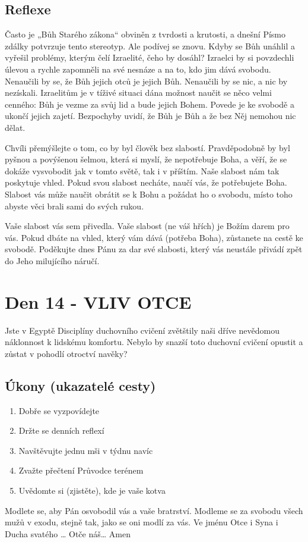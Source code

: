 \documentclass[11pt]{article}
\newcommand{\zacatekDruhyTyden}{
  Jste v Egyptě \newline
  Disciplíny duchovního cvičení zvětštily naši dříve nevědomou náklonnost k lidskému komfortu.
  Nebylo by snazší toto duchovní cvičení opustit a zůstat v pohodlí otroctví navěky?

  \subsection*{Úkony (ukazatelé cesty)}
\begin{enumerate}
  \item Dobře se vyzpovídejte
  \item Držte se denních reflexí
  \item Navštěvujte jednu mši v týdnu navíc
  \item Zvažte přečtení Průvodce terénem
  \item Uvědomte si (zjistěte), kde je vaše kotva
\end{enumerate}
Modlete se, aby Pán osvobodil vás a vaše bratrství. \newline
Modleme se za svobodu všech mužů v exodu, stejně tak, jako se oni modlí za vás.\newline
Ve jménu Otce i Syna i Ducha svatého …  Otče náš… Amen
}
\begin{document}
\subsection*{Reflexe}

Často je „Bůh Starého zákona“ obviněn z tvrdosti a krutosti, a dnešní Písmo zdálky potvrzuje tento stereotyp. Ale
podívej se znovu. Kdyby se Bůh unáhlil a vyřešil problémy, kterým čelí Izraelité, čeho by dosáhl? Izraelci by si
povzdechli úlevou a rychle zapomněli na své nesnáze a na to, kdo jim dává svobodu. Nenaučili by se, že Bůh jejich
otců je jejich Bůh. Nenaučili by se nic, a nic by nezískali. Izraelitům je v tíživé situaci dána možnost naučit se něco
velmi cenného: Bůh je vezme za svůj lid a bude jejich Bohem. Povede je ke svobodě a ukončí jejich zajetí.
Bezpochyby uvidí, že Bůh je Bůh a že bez Něj nemohou nic dělat.

Chvíli přemýšlejte o tom, co by byl člověk bez slabostí. Pravděpodobně by byl pyšnou a povýšenou šelmou, která si
myslí, že nepotřebuje Boha, a věří, že se dokáže vysvobodit jak v tomto světě, tak i v příštím. Naše slabost nám tak
poskytuje vhled. Pokud svou slabost necháte, naučí vás, že potřebujete Boha. Slabost vás může naučit obrátit se
k Bohu a požádat ho o svobodu, místo toho abyste věci brali sami do svých rukou.

Vaše slabost vás sem přivedla. Vaše slabost (ne váš hřích) je Božím darem pro vás. Pokud dbáte na vhled, který vám
dává (potřeba Boha), zůstanete na cestě ke svobodě. Poděkujte dnes Pánu za dar své slabosti, který vás neustále
přivádí zpět do Jeho milujícího náručí.

\newpage
\section{Den 14 - VLIV OTCE}
\zacatekDruhyTyden
\end{document}
